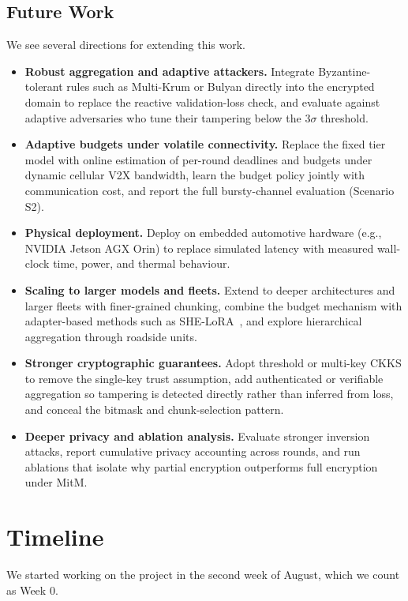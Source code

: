 \documentclass[acmtog,nonacm]{acmart}
\begin{document}
\subsection{Future Work}
We see several directions for extending this work.
\begin{itemize}
\item \textbf{Robust aggregation and adaptive attackers.} Integrate Byzantine-tolerant rules such as Multi-Krum or Bulyan directly into the encrypted domain to replace the reactive validation-loss check, and evaluate against adaptive adversaries who tune their tampering below the $3\sigma$ threshold.
\item \textbf{Adaptive budgets under volatile connectivity.} Replace the fixed tier model with online estimation of per-round deadlines and budgets under dynamic cellular V2X bandwidth, learn the budget policy jointly with communication cost, and report the full bursty-channel evaluation (Scenario S2).
\item \textbf{Physical deployment.} Deploy on embedded automotive hardware (e.g., NVIDIA Jetson AGX Orin) to replace simulated latency with measured wall-clock time, power, and thermal behaviour.
\item \textbf{Scaling to larger models and fleets.} Extend to deeper architectures and larger fleets with finer-grained chunking, combine the budget mechanism with adapter-based methods such as SHE-LoRA~\cite{liu2026shelora}, and explore hierarchical aggregation through roadside units.
\item \textbf{Stronger cryptographic guarantees.} Adopt threshold or multi-key CKKS to remove the single-key trust assumption, add authenticated or verifiable aggregation so tampering is detected directly rather than inferred from loss, and conceal the bitmask and chunk-selection pattern.
\item \textbf{Deeper privacy and ablation analysis.} Evaluate stronger inversion attacks, report cumulative privacy accounting across rounds, and run ablations that isolate why partial encryption outperforms full encryption under MitM.
\end{itemize}

\FloatBarrier
\section{Timeline}
We started working on the project in the second week of August, which we count as Week 0.
\end{document}
